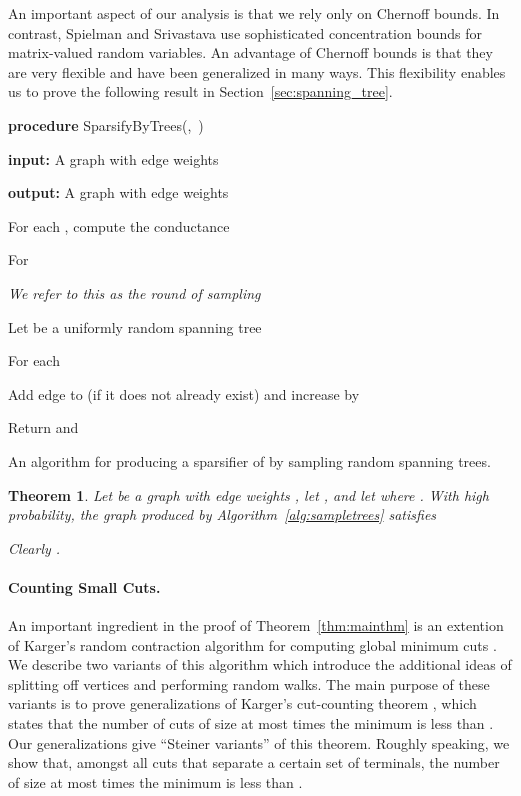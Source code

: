 \documentclass[11pt]{article}
\numberwithin{equation}{section}
\newenvironment{alg}{
    \begin{list}{}{
        \setlength{\itemsep}{2pt}
        \setlength{\parsep}{0pt}
        \setlength{\parskip}{0pt}
        \setlength{\topsep}{1pt}
    }
}
{
    \end{list}
}
\newtheorem{theorem}{Theorem}[section]
\newcommand{\AlgorithmName}[1]{\label{alg:#1}}
\newcommand{\Algorithm}[1]{Algorithm~\ref{alg:#1}}
\newcommand{\Section}[1]{Section~\ref{sec:#1}}
\newcommand{\TheoremName}[1]{\label{thm:#1}}
\newcommand{\Theorem}[1]{Theorem~\ref{thm:#1}}
\begin{document}
\vspace{6pt}

An important aspect of our analysis is that we rely only on Chernoff bounds.
In contrast, Spielman and Srivastava \cite{SS} use sophisticated concentration bounds for
matrix-valued random variables.
An advantage of Chernoff bounds is that they are very flexible
and have been generalized in many ways.
This flexibility enables us to prove the following result in \Section{spanning_tree}.


\begin{algorithm}
\begin{alg}
\item	\textbf{procedure} SparsifyByTrees(,\, )
\item	\textbf{input:} A graph 
        with edge weights 
\item	\textbf{output:} A graph  with edge weights 
\item   For each , compute the conductance 
\item   For 
    \begin{alg}
    \item    \textit{We refer to this as the  round of sampling}
    \item   Let  be a uniformly random spanning tree
    \item   For each 
        \begin{alg}
        \item   Add edge  to 
                (if it does not already exist) and increase  by 
        \end{alg}
    \end{alg}
\item   Return  and 
\end{alg}
\caption{An algorithm for producing a sparsifier of  by sampling random spanning trees.}
\AlgorithmName{sampletrees}
\end{algorithm}


\begin{theorem}
\TheoremName{sample_with_trees}
Let  be a graph with edge weights ,
let , and let  where .
With high probability, the graph  produced by \Algorithm{sampletrees} satisfies

Clearly .
\end{theorem}


\paragraph{Counting Small Cuts.}
An important ingredient in the proof of \Theorem{mainthm}
is an extention of Karger's random contraction algorithm
for computing global minimum cuts \cite{KargerContract,KargerStein}.
We describe two variants of this algorithm which introduce the additional ideas 
of splitting off vertices and performing random walks.
The main purpose of these variants is to prove generalizations of Karger's cut-counting
theorem \cite{KargerContract,KargerStein},
which states that the number of cuts of size at most  times the
minimum is less than .
Our generalizations give ``Steiner variants'' of this theorem.
Roughly speaking, we show that, amongst all cuts that separate a certain set of terminals,
the number of size at most  times the minimum is less than .
\end{document}
